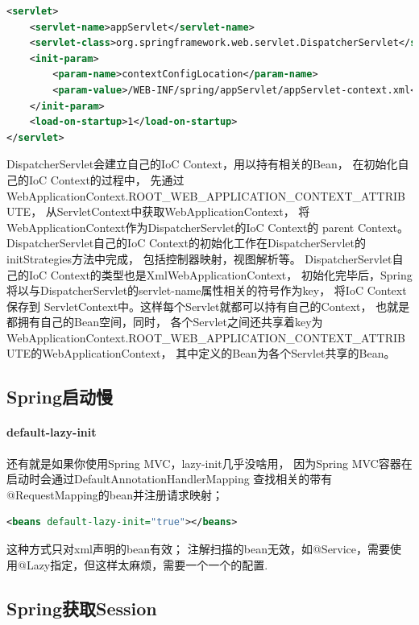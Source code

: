 \documentclass{book}
\begin{document}
\begin{lstlisting}[language=XML]
<servlet>
	<servlet-name>appServlet</servlet-name>
	<servlet-class>org.springframework.web.servlet.DispatcherServlet</servlet-class>
	<init-param>
		<param-name>contextConfigLocation</param-name>
		<param-value>/WEB-INF/spring/appServlet/appServlet-context.xml</param-value>
	</init-param>
	<load-on-startup>1</load-on-startup>
</servlet>
\end{lstlisting}

DispatcherServlet会建立自己的IoC Context，用以持有相关的Bean，
在初始化自己的IoC Context的过程中，
先通过WebApplicationContext.ROOT\_WEB\_APPLICATION\_CONTEXT\_ATTRIBUTE，
从ServletContext中获取WebApplicationContext，
将WebApplicationContext作为DispatcherServlet的IoC Context的 parent Context。
DispatcherServlet自己的IoC Context的初始化工作在DispatcherServlet的initStrategies方法中完成，
包括控制器映射，视图解析等。
DispatcherServlet自己的IoC Context的类型也是XmlWebApplicationContext，
初始化完毕后，Spring将以与DispatcherServlet的servlet-name属性相关的符号作为key，
将IoC Context保存到 ServletContext中。这样每个Servlet就都可以持有自己的Context，
也就是都拥有自己的Bean空间，同时，
各个Servlet之间还共享着key为
WebApplicationContext.ROOT\_WEB\_APPLICATION\_CONTEXT\_ATTRIBUTE的WebApplicationContext，
其中定义的Bean为各个Servlet共享的Bean。

\subsection{Spring启动慢}

\paragraph{default-lazy-init}

还有就是如果你使用Spring MVC，lazy-init几乎没啥用，
因为Spring MVC容器在启动时会通过DefaultAnnotationHandlerMapping
查找相关的带有@RequestMapping的bean并注册请求映射；

\begin{lstlisting}[language=XML]
<beans default-lazy-init="true"></beans>
\end{lstlisting}

这种方式只对xml声明的bean有效；
注解扫描的bean无效，如@Service，需要使用@Lazy指定，但这样太麻烦，需要一个一个的配置.

\subsection{Spring获取Session}
\end{document}
